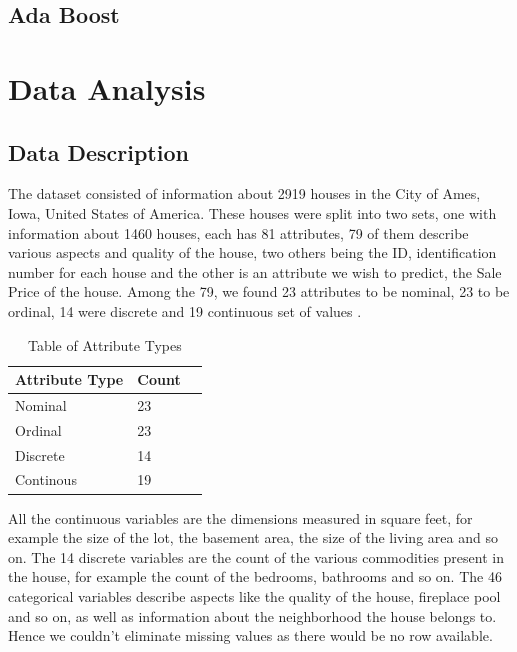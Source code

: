 \documentclass[fleqn,10pt]{SelfArx} %
\begin{document}
	\subsection{Ada Boost}
	
	
	\section{Data Analysis}
	
	\subsection{Data Description}
	The dataset consisted of information about 2919 houses in the City of Ames, Iowa, United States of America. These houses were split into two sets, one  with information about 1460 houses, each has 81 attributes, 79 of them describe various aspects and quality of the house, two others being the ID, identification number for each house and the other is an attribute we wish to predict, the Sale Price of the house. Among the 79, we found 23 attributes to be nominal, 23 to be ordinal, 14 were discrete and 19 continuous set of values \cite{dataset}.\\
	
	\begin{table}[hbt]
		\caption{Table of Attribute Types}
		\centering
		\begin{tabular}{llr}
			\cmidrule(r){1-2}
			Attribute Type & Count \\
			\midrule
			Nominal & 23 \\
			Ordinal & 23 \\
			Discrete & 14 \\
			Continous & 19
		\end{tabular}
		\label{tab:label}
	\end{table}
	
	All the continuous variables are the dimensions measured in square feet, for example the size of the lot, the basement area, the size of the living area and so on. The 14 discrete variables are the count of the various commodities present in the house, for example the count of the bedrooms, bathrooms and so on. The 46 categorical variables describe aspects like the quality of the house, fireplace pool and so on, as well as information about the neighborhood the house belongs to. Hence we couldn't eliminate missing values as there would be no row available.\\
	
\end{document}
